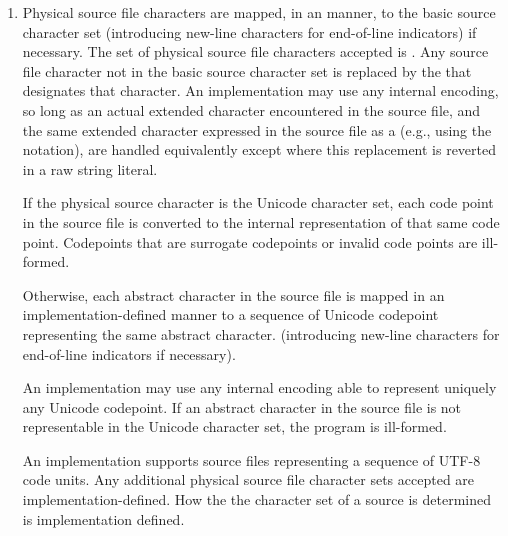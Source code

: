 \documentclass{wg21}
\begin{document}
\begin{enumerate}
    \item
    \begin{removedblock}
    Physical source file characters are mapped, in an
     manner,
    to the basic source character set (introducing new-line characters for end-of-line
    indicators) if necessary.
    The set of physical source file characters accepted is .
    Any
    source file character not in the basic source character
    set is replaced by the
     that
    designates that character. An implementation may use any internal
    encoding, so long as an actual extended character encountered in the
    source file, and the same extended character expressed in the source
    file as a  (e.g., using the  notation), are handled equivalently
    except where this replacement is reverted in a raw string literal.

    \end{removedblock}
    \begin{addedblock}

    If the physical source character is the Unicode character set, each code point in the source file is converted to the internal representation of that same code point. Codepoints that are surrogate codepoints or invalid code points are ill-formed.
    
    Otherwise, each abstract character in the source file is mapped in an implementation-defined manner to a sequence of Unicode codepoint representing the same abstract character.
    (introducing new-line characters for end-of-line indicators if necessary).
    
    An implementation may use any internal encoding able to represent uniquely any Unicode codepoint.
    If an abstract character in the source file is not representable in the Unicode character set, the program is ill-formed.
    
    An implementation supports source files representing a sequence of UTF-8 code units. Any additional physical source file character sets accepted are implementation-defined. How the the character set of a source is determined is implementation defined.
    


\end{addedblock}
\end{enumerate}
\end{document}
